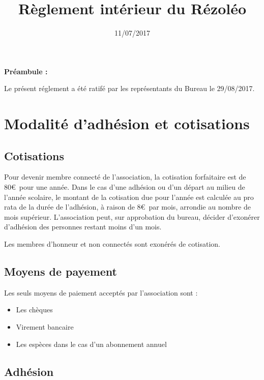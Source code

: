 \documentclass[12pt]{article}
\begin{document}
\title{Règlement intérieur du Rézoléo}
\author{}
\date{11/07/2017}
\maketitle

\textbf{\large{Préambule : \\}}

\noindent Le présent réglement a été ratifé par les représentants du Bureau le  29/08/2017.

\newpage

\tableofcontents

\newpage

\section{Modalité d'adhésion et cotisations}
	\subsection{Cotisations}

		Pour devenir membre connecté de l'association, la cotisation forfaitaire est de 80\euro \ pour une année. Dans le cas d'une adhésion ou d'un départ au milieu de l'année scolaire, le montant de la cotisation due pour l'année est calculée au pro rata de la durée de l'adhésion, à raison de 8\euro \ par mois, arrondie au nombre de mois supérieur. L'association peut, sur approbation du bureau, décider d'exonérer d'adhésion des personnes restant moins d'un mois.

		Les membres d'honneur et non connectés sont exonérés de cotisation.

    \subsection{Moyens de payement}

		Les seuls moyens de paiement acceptés par l'association sont :

			\begin{itemize}
		    	\item[\textbullet] Les chèques
		    	\item[\textbullet] Virement bancaire
			\item[\textbullet] Les espèces dans le cas d'un abonnement annuel 
		    \end{itemize}
		    

    \subsection{Adhésion}
\end{document}
